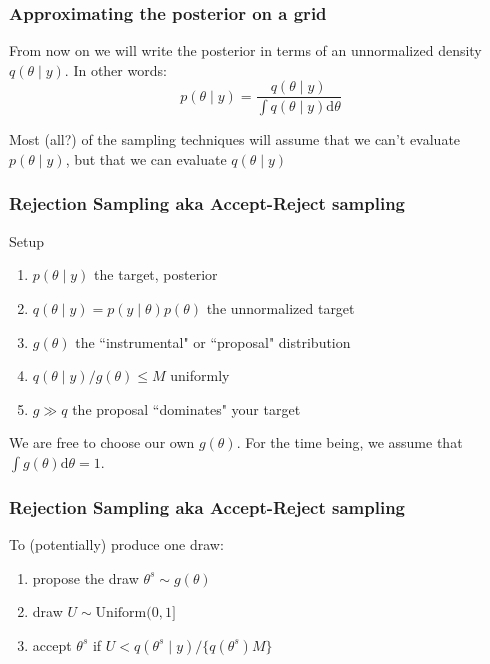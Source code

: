 \documentclass{beamer}
\begin{document}
\begin{frame}[fragile]
\frametitle{Approximating the posterior on a grid}

From now on we will write the posterior in terms of an unnormalized density $q(\theta \mid y)$. In other words:
\[
p(\theta \mid y) = \frac{q(\theta \mid y)}{ \int q(\theta \mid y) \text{d}\theta}
\]

Most (all?) of the sampling techniques will assume that we can't evaluate $p(\theta \mid y)$, but that we can evaluate $q(\theta \mid y)$

\end{frame}
\begin{frame}[fragile]
\frametitle{Rejection Sampling aka Accept-Reject sampling}

Setup
\begin{enumerate}
\item $p(\theta \mid y)$ the target, posterior
\item $q(\theta \mid y) = p(y \mid \theta) p(\theta)$ the unnormalized target
\item $g(\theta)$ the ``instrumental" or ``proposal" distribution
\item $q(\theta \mid y) / g(\theta) \le M$ uniformly
\item $g \gg q$ the proposal ``dominates" your target
\end{enumerate}
We are free to choose our own $g(\theta)$. For the time being, we assume that $\int g(\theta) \text{d}\theta = 1$.

\end{frame}
\begin{frame}[fragile]
\frametitle{Rejection Sampling aka Accept-Reject sampling}


To (potentially) produce one draw:
\begin{enumerate}
\item propose the draw $\theta^s \sim g(\theta)$
\item draw $U \sim \text{Uniform}(0,1]$
\item accept $\theta^s$ if $U < q(\theta^s \mid y) / \{ q(\theta^s)  M\}$
\end{enumerate}


\end{frame}
\end{document}
